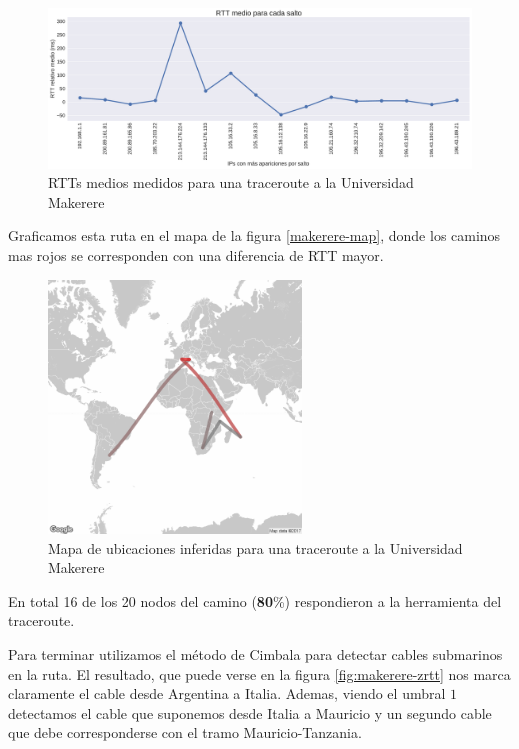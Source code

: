 \begin{figure}[H]
   \centering
       \includegraphics[width=1\textwidth, height=1\textheight, keepaspectratio]{../img/mak-ac-ug-rtts}
 \caption{RTTs medios medidos para una traceroute a la Universidad Makerere}
 \label{fig:makerere-rtts}
\end{figure}

Graficamos esta ruta en el mapa de la figura \ref{makerere-map}, donde los caminos mas rojos se corresponden con una diferencia de RTT mayor.

\begin{figure}[H]
   \centering
       \includegraphics[width=0.6\textwidth, keepaspectratio]{../img/mak-ac-ug-map}
 \caption{Mapa de ubicaciones inferidas para una traceroute a la Universidad Makerere}
 \label{fig:makerere-map}
\end{figure}

En total 16 de los 20 nodos del camino (\textbf{80}\%) respondieron a la herramienta del traceroute.

Para terminar utilizamos el método de Cimbala para detectar cables submarinos en la ruta. El resultado, que puede verse en la figura \ref{fig:makerere-zrtt} nos marca claramente el cable desde Argentina a Italia. Ademas, viendo el umbral $1$ detectamos el cable que suponemos desde Italia a Mauricio y un segundo cable que debe corresponderse con el tramo Mauricio-Tanzania.
 
